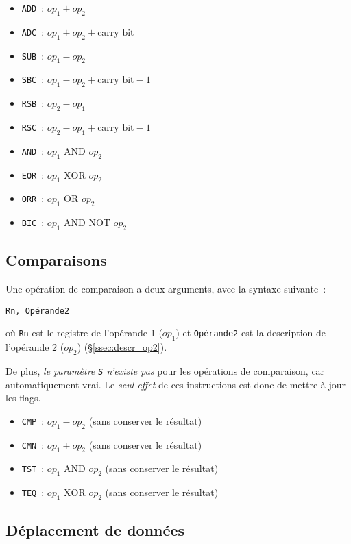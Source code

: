 \documentclass[11pt,a4paper]{article}
\begin{document}
\begin{itemize}
\item \texttt{ADD}~: $op_1 + op_2$
\item \texttt{ADC}~: $op_1 + op_2 + \text{carry bit}$
\item \texttt{SUB}~: $op_1 - op_2$
\item \texttt{SBC}~: $op_1 - op_2 + \text{carry bit} - 1$
\item \texttt{RSB}~: $op_2 - op_1$
\item \texttt{RSC}~: $op_2 - op_1 + \text{carry bit} - 1$

\item \texttt{AND}~: $op_1\text{ AND }op_2$
\item \texttt{EOR}~: $op_1\text{ XOR }op_2$
\item \texttt{ORR}~: $op_1\text{ OR }op_2$
\item \texttt{BIC}~: $op_1\text{ AND NOT }op_2$
\end{itemize}

\subsection{Comparaisons}

Une opération de comparaison a deux arguments, avec la syntaxe suivante~:

\begin{center}\texttt{Rn, Opérande2}\end{center}

où \texttt{Rn} est le registre de l'opérande 1 ($op_1$) et \texttt{Opérande2} est la description de l'opérande 2 ($op_2$) (§\ref{ssec:descr_op2}).

De plus, \emph{le paramètre \texttt{S} n'existe pas} pour les opérations de comparaison, car automatiquement vrai. Le \emph{seul effet} de ces instructions est donc de mettre à jour les flags.

\begin{itemize}
\item \texttt{CMP}~: $op_1 - op_2$ (sans conserver le résultat)
\item \texttt{CMN}~: $op_1 + op_2$ (sans conserver le résultat)
\item \texttt{TST}~: $op_1\text{ AND }op_2$ (sans conserver le résultat)
\item \texttt{TEQ}~: $op_1\text{ XOR }op_2$ (sans conserver le résultat)
\end{itemize}

\subsection{Déplacement de données}
\end{document}
